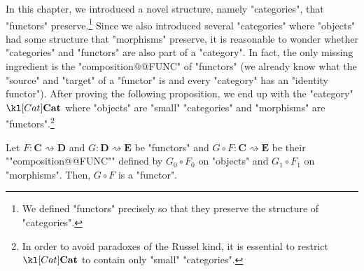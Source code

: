 \documentclass[main.tex]{subfiles}
\begin{document}
In this chapter, we introduced a novel structure, namely "categories", that "functors" preserve.\footnote{We defined "functors" precisely so that they preserve the structure of "categories".} Since we also introduced several "categories" where "objects" had some structure that "morphisms" preserve, it is reasonable to wonder whether "categories" and "functors" are also part of a "category". In fact, the only missing ingredient is the "composition@@FUNC" of "functors" (we already know what the "source" and "target" of a "functor" is and every "category" has an "identity functor"). After proving the following proposition, we end up with the "category" $\catCat$ where "objects" are "small" "categories" and "morphisms" are "functors".\footnote{In order to avoid paradoxes of the Russel kind, it is essential to restrict $\catCat$ to contain only "small" "categories".}
\begin{prop}
	\AP Let $F:\mathbf{C}\rightsquigarrow \mathbf{D}$ and $G: \mathbf{D}\rightsquigarrow \mathbf{E}$ be "functors" and $G \circ F:\mathbf{C} \rightsquigarrow \mathbf{E}$ be their ""composition@@FUNC"" defined by $G_0 \circ F_0$ on "objects" and $G_1 \circ F_1$ on "morphisms". Then, $G \circ F$ is a "functor".
\end{prop}
\end{document}
